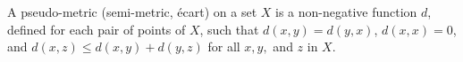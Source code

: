 A pseudo-metric (semi-metric, écart) on a set $X$ is a non-negative function $d$, defined for each pair of points of $X$, such that $d(x,y) = d(y,x)$, $d(x,x) = 0$, and $d(x,z) \leq d(x,y) + d(y,z)$ for all $x, y,$ and $z$ in $X$.
